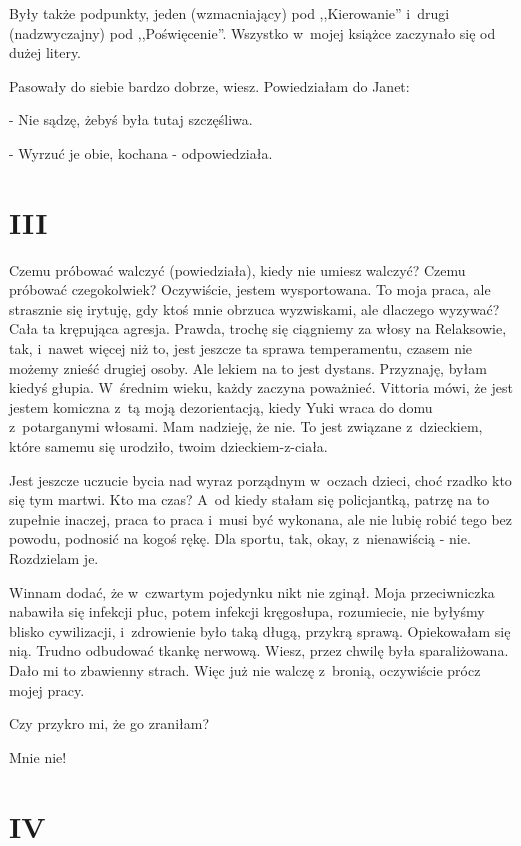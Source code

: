 \documentclass[oneside,polish,12pt,sfheadings]{mwbk}
\begin{document}
Były także podpunkty, jeden (wzmacniający) pod ,,Kierowanie'' i~drugi
(nadzwyczajny) pod ,,Poświęcenie''. Wszystko w~mojej książce zaczynało
się od dużej litery.

Pasowały do siebie bardzo dobrze, wiesz. Powiedziałam do Janet: 

- Nie sądzę, żebyś była tutaj szczęśliwa.

- Wyrzuć je obie, kochana - odpowiedziała.

\chapter{III}

Czemu próbować walczyć (powiedziała), kiedy nie umiesz walczyć? Czemu
próbować czegokolwiek? Oczywiście, jestem wysportowana. To moja praca,
ale strasznie się irytuję, gdy ktoś mnie obrzuca wyzwiskami, ale dlaczego
wyzywać? Cała ta krępująca agresja. Prawda, trochę się ciągniemy za
włosy na Relaksowie, tak, i~nawet więcej niż to, jest jeszcze ta sprawa
temperamentu, czasem nie możemy znieść drugiej osoby. Ale lekiem na
to jest dystans. Przyznaję, byłam kiedyś głupia. W~średnim wieku,
każdy zaczyna poważnieć. Vittoria mówi, że jest jestem komiczna z~tą moją dezorientacją, kiedy Yuki wraca do domu z~potarganymi włosami.
Mam nadzieję, że nie. To jest związane z~dzieckiem, które samemu się
urodziło, twoim dzieckiem-z-ciała.

Jest jeszcze uczucie bycia nad wyraz porządnym w~oczach dzieci, choć
rzadko kto się tym martwi. Kto ma czas? A~od kiedy stałam się policjantką,
patrzę na to zupełnie inaczej, praca to praca i~musi być wykonana,
ale nie lubię robić tego bez powodu, podnosić na kogoś rękę. Dla sportu,
tak, okay, z~nienawiścią - nie. Rozdzielam je.

Winnam dodać, że w~czwartym pojedynku nikt nie zginął. Moja przeciwniczka
nabawiła się infekcji płuc, potem infekcji kręgosłupa, rozumiecie,
nie byłyśmy blisko cywilizacji, i~zdrowienie było taką długą, przykrą
sprawą. Opiekowałam się nią. Trudno odbudować tkankę nerwową. Wiesz,
przez chwilę była sparaliżowana. Dało mi to zbawienny strach. Więc
już nie walczę z~bronią, oczywiście prócz mojej pracy.

Czy przykro mi, że go zraniłam?

Mnie nie!

\chapter{IV}
\end{document}
